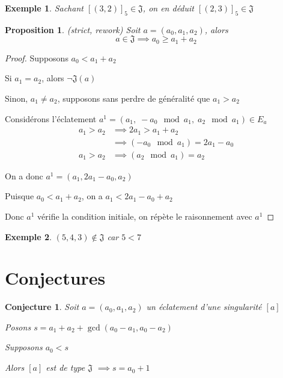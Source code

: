 \documentclass{article}
\newtheorem{proposition}{Proposition}
\newtheorem{conjecture}{Conjecture}
\newtheorem{example}{Exemple}
\begin{document}
\begin{example}
    Sachant ${[(3, 2)]}_5 \in \mathfrak{J}$, on en déduit ${[(2, 3)]}_5 \in \mathfrak{J}$
\end{example}

\newpage

\begin{proposition}
    (strict, rework) Soit $a=(a_0, a_1, a_2)$, alors
    \[ a \in \mathfrak{J} \implies a_0 \geq a_1 + a_2 \]
\end{proposition}

\begin{proof}
    Supposons $a_0 < a_1 + a_2$

    Si $a_1 = a_2$, alors $\neg \mathfrak{J}(a)$

    Sinon, $a_1 \neq a_2$, supposons sans perdre de généralité que $a_1 > a_2$

    Considérons l'éclatement $a^1 = (a_1,\; -a_0 \mod a_1,\; a_2 \mod a_1) \in E_a$
    \begin{align*}
        a_1 > a_2 & \implies 2a_1 > a_1+a_2               \\
                  & \implies (-a_0 \mod a_1) = 2a_1 - a_0 \\
        a_1 > a_2 & \implies (a_2 \mod a_1) = a_2
    \end{align*}

    On a donc $a^1 = (a_1, 2a_1-a_0, a_2)$

    Puisque $a_0 < a_1 + a_2$, on a $a_1 < 2a_1 - a_0 + a_2$

    Donc $a^1$ vérifie la condition initiale, on répète le raisonnement avec $a^1$
\end{proof}

\begin{example}
    $(5, 4, 3) \not \in \mathfrak{J}$ car $5 < 7$
\end{example}

\section{Conjectures}

\begin{conjecture}
    Soit $a=(a_0, a_1, a_2)$ un éclatement d'une singularité $[a]$

    Posons $s = a_1 + a_2 + \gcd(a_0-a_1, a_0-a_2)$

    Supposons $a_0 < s$

    Alors $[a]$ est de type $\mathfrak{J}$ $\implies s = a_0 + 1$
\end{conjecture}
\end{document}
